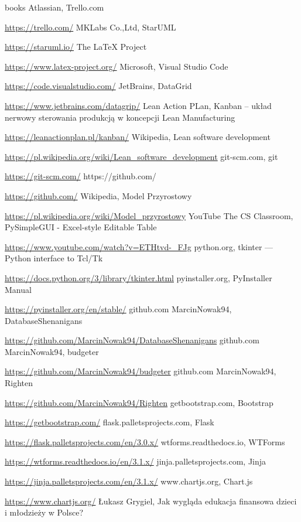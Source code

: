 \documentclass[a4paper,10pt, twoside]{report}
\begin{document}
\begin{thebibliography} {books}
     Atlassian, Trello.com \raggedright\url{
        https://trello.com/}
     MKLabs Co.,Ltd, StarUML \raggedright\url{
        https://staruml.io/}
     The LaTeX Project \raggedright\url{
        https://www.latex-project.org/}
     Microsoft, Visual Studio Code \raggedright\url{
        https://code.visualstudio.com/}
     JetBrains, DataGrid \raggedright\url{
        https://www.jetbrains.com/datagrip/}
     Lean Action PLan, Kanban – układ nerwowy sterowania produkcją w koncepcji Lean Manufacturing \raggedright\url{
        https://leanactionplan.pl/kanban/}
     Wikipedia, Lean software development \raggedright\url{
        https://pl.wikipedia.org/wiki/Lean_software_development}
     git-scm.com, git \raggedright\url{
        https://git-scm.com/}
     https://github.com/ \raggedright\url{
        https://github.com/}
     Wikipedia, Model Przyrostowy \raggedright\url{
        https://pl.wikipedia.org/wiki/Model_przyrostowy}
     YouTube The CS Classroom, PySimpleGUI - Excel-style Editable Table \raggedright\url{
        https://www.youtube.com/watch?v=ETHtvd-_FJg}
     python.org, tkinter — Python interface to Tcl/Tk \raggedright\url{
        https://docs.python.org/3/library/tkinter.html}
     pyinstaller.org, PyInstaller Manual \raggedright\url{
        https://pyinstaller.org/en/stable/}
     github.com MarcinNowak94, DatabaseShenanigans \raggedright\url{
        https://github.com/MarcinNowak94/DatabaseShenanigans}
     github.com MarcinNowak94, budgeter \raggedright\url{
        https://github.com/MarcinNowak94/budgeter}
     github.com MarcinNowak94, Righten \raggedright\url{
        https://github.com/MarcinNowak94/Righten}
     getbootstrap.com, Bootstrap \raggedright\url{
        https://getbootstrap.com/}
     flask.palletsprojects.com, Flask \raggedright\url{
        https://flask.palletsprojects.com/en/3.0.x/}
     wtforms.readthedocs.io, WTForms \raggedright\url{
        https://wtforms.readthedocs.io/en/3.1.x/}
     jinja.palletsprojects.com, Jinja \raggedright\url{
        https://jinja.palletsprojects.com/en/3.1.x/}
     www.chartjs.org, Chart.js \raggedright\url{
        https://www.chartjs.org/}
     Łukasz Grygiel, Jak wygląda edukacja finansowa dzieci i młodzieży w Polsce? \raggedright\url{
}
\end{thebibliography}
\end{document}
